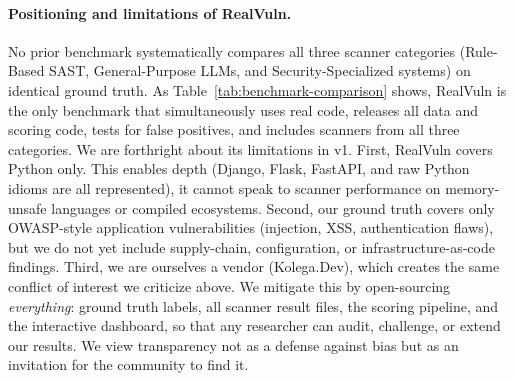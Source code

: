 \paragraph{Positioning and limitations of RealVuln.}
No prior benchmark systematically compares all three scanner
categories (Rule-Based SAST, General-Purpose LLMs, and Security-Specialized
systems) on identical ground truth. As Table~\ref{tab:benchmark-comparison}
shows, RealVuln is the only benchmark that simultaneously uses real code,
releases all data and scoring code, tests for false positives, and includes
scanners from all three categories.
We are forthright about its limitations in v1. First, RealVuln covers
Python only. This enables depth (Django, Flask, FastAPI, and raw Python
idioms are all represented), it cannot speak to scanner performance on memory-unsafe
languages or compiled ecosystems. Second, our ground truth covers only
OWASP-style application vulnerabilities (injection, XSS, authentication
flaws), but we do not yet include supply-chain, configuration, or
infrastructure-as-code findings. Third, we are ourselves a vendor (Kolega.Dev),
which creates the same conflict of interest we criticize above. We mitigate
this by open-sourcing \emph{everything}: ground truth labels, all scanner
result files, the scoring pipeline, and the interactive dashboard, so that any
researcher can audit, challenge, or extend our results. We view transparency
not as a defense against bias but as an invitation for the community to find it.
